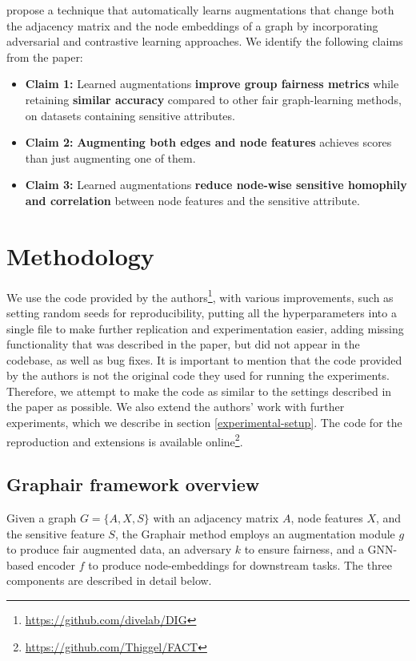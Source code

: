 \citet{ling2023learning} propose a technique that automatically learns augmentations that change both the adjacency matrix and the node embeddings of a graph by incorporating adversarial and contrastive learning approaches. We identify the following claims from the paper:
\begin{itemize}[leftmargin=*]
    \item[]\textbf{Claim 1:} Learned augmentations \textbf{improve group fairness metrics} while retaining \textbf{similar accuracy} compared to other fair graph-learning methods, on datasets containing sensitive attributes.
    \item[]\textbf{Claim 2:} \textbf{Augmenting both edges and node features} achieves  scores than just augmenting one of them.
    \item[]\textbf{Claim 3:} Learned augmentations \textbf{reduce node-wise sensitive homophily and correlation} between node features and the sensitive attribute.
\end{itemize}

\section{Methodology}
 We use the code provided by the authors\footnote{\url{https://github.com/divelab/DIG}}, with various improvements, such as setting random seeds for reproducibility, putting all the hyperparameters into a single file to make further replication and experimentation easier, adding missing functionality that was described in the paper, but did not appear in the codebase, as well as bug fixes. 
 It is important to mention that the code provided by the authors is not the original code they used for running the experiments. Therefore, we attempt to make the code as similar to the settings described in the paper as possible. 
 We also extend the authors' work with further experiments, which we describe in section \ref{experimental-setup}. The code for the reproduction and extensions is available online\footnote{\url{https://github.com/Thiggel/FACT}}.


\subsection{Graphair framework overview}
Given a graph $G = \{A, X, S\}$ with an adjacency matrix $A$, node features $X$, and the sensitive feature $S$, the Graphair method employs an augmentation module $g$ to produce fair augmented data, an adversary $k$ to ensure fairness, and a GNN-based encoder $f$ to produce node-embeddings for downstream tasks. The three components are described in detail below.


